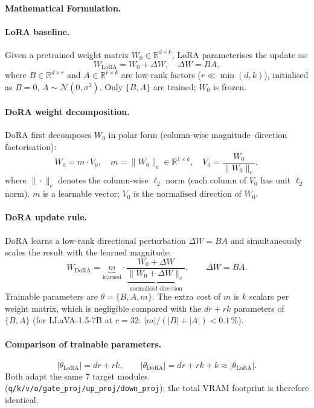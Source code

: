 \documentclass[onecolumn]{article}
\begin{document}
\paragraph{Mathematical Formulation.}

\paragraph{LoRA baseline.}
Given a pretrained weight matrix $W_0 \in \mathbb{R}^{d \times k}$,
LoRA parameterises the update as:
\[
  W_{\text{LoRA}} = W_0 + \Delta W, \quad
  \Delta W = B A,
\]
where $B \in \mathbb{R}^{d \times r}$ and $A \in \mathbb{R}^{r \times k}$
are low-rank factors ($r \ll \min(d, k)$),
initialised as $B = 0$, $A \sim \mathcal{N}(0, \sigma^2)$.
Only $\{B, A\}$ are trained; $W_0$ is frozen.

\paragraph{DoRA weight decomposition.}
DoRA first decomposes $W_0$ in polar form
(column-wise magnitude--direction factorisation):
\[
  W_0 = m \cdot V_0,
  \quad
  m = \|W_0\|_c \in \mathbb{R}^{1 \times k},
  \quad
  V_0 = \frac{W_0}{\|W_0\|_c},
\]
where $\|\cdot\|_c$ denotes the column-wise $\ell_2$ norm
(each column of $V_0$ has unit $\ell_2$ norm).
$m$ is a learnable vector; $V_0$ is the normalised direction of $W_0$.

\paragraph{DoRA update rule.}
DoRA learns a low-rank directional perturbation $\Delta W = BA$
and simultaneously scales the result with the learned magnitude:
\[
  W_{\text{DoRA}}
  = \underbrace{m}_{\text{learned}}
    \cdot
    \underbrace{\frac{W_0 + \Delta W}{\|W_0 + \Delta W\|_c}}_{\text{normalised direction}},
  \qquad
  \Delta W = BA.
\]
Trainable parameters are $\theta = \{B, A, m\}$.
The extra cost of $m$ is $k$ scalars per weight matrix,
which is negligible compared with the $dr + rk$ parameters of $\{B, A\}$
(for LLaVA-1.5-7B at $r=32$: $|m| / (|B|+|A|) < 0.1\,\%$).

\paragraph{Comparison of trainable parameters.}
\[
  |\theta_{\text{LoRA}}| = dr + rk, \qquad
  |\theta_{\text{DoRA}}| = dr + rk + k \approx |\theta_{\text{LoRA}}|.
\]
Both adapt the same 7 target modules
(\texttt{q/k/v/o/gate\_proj/up\_proj/down\_proj});
the total VRAM footprint is therefore identical.
\end{document}
